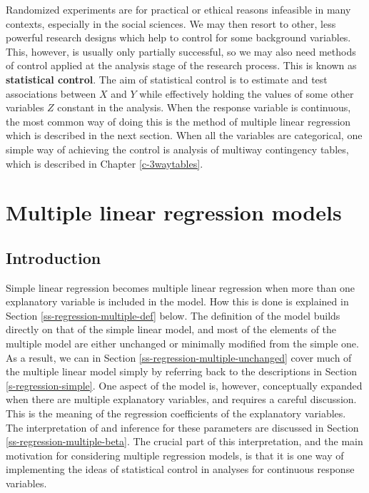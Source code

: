 \documentclass[11pt,a4paper,openany]{book}
\begin{document}
Randomized experiments are for practical or ethical reasons infeasible
in many contexts, especially in the social sciences. We may then resort
to other, less powerful research designs which help to control for some
background variables. This, however, is usually only partially
successful, so we may also need methods of control applied at the
analysis stage of the research process. This is known as
\textbf{statistical control}. The aim of statistical control is to
estimate and test associations between \(X\) and \(Y\) while effectively
holding the values of some other variables \(Z\) constant in the
analysis. When the response variable is continuous, the most common way
of doing this is the method of multiple linear regression which is
described in the next section. When all the variables are categorical,
one simple way of achieving the control is analysis of multiway
contingency tables, which is described in Chapter \ref{c-3waytables}.

\section{Multiple linear regression models}\label{s-regression-multiple}

\subsection{Introduction}\label{ss-regression-multiple-intro}

Simple linear regression becomes multiple linear regression when more
than one explanatory variable is included in the model. How this is done
is explained in Section \ref{ss-regression-multiple-def} below. The
definition of the model builds directly on that of the simple linear
model, and most of the elements of the multiple model are either
unchanged or minimally modified from the simple one. As a result, we can
in Section \ref{ss-regression-multiple-unchanged} cover much of the
multiple linear model simply by referring back to the descriptions in
Section \ref{s-regression-simple}. One aspect of the model is, however,
conceptually expanded when there are multiple explanatory variables, and
requires a careful discussion. This is the meaning of the regression
coefficients of the explanatory variables. The interpretation of and
inference for these parameters are discussed in Section
\ref{ss-regression-multiple-beta}. The crucial part of this
interpretation, and the main motivation for considering multiple
regression models, is that it is one way of implementing the ideas of
statistical control in analyses for continuous response variables.
\end{document}
